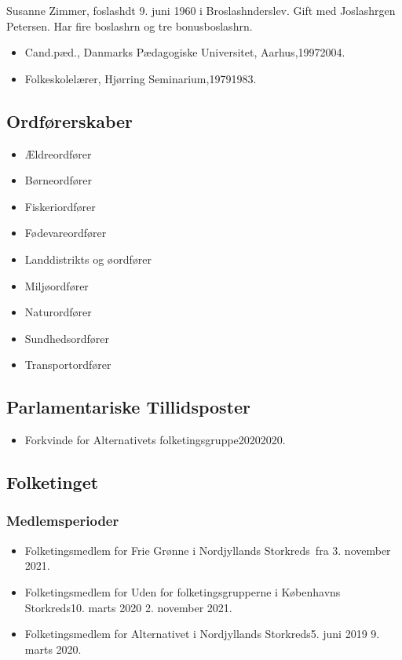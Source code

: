 \documentclass[11pt, a4paper]{awesome-cv}
\begin{document}
\makecvheader[R]
\makelettertitle
\begin{cvletter}
Susanne Zimmer, foslashdt 9. juni 1960 i Broslashnderslev. Gift med Joslashrgen Petersen. Har fire boslashrn og tre bonusboslashrn.

\begin{itemize}
\item Cand.pæd., Danmarks Pædagogiske Universitet, Aarhus,19972004.
\item Folkeskolelærer, Hjørring Seminarium,19791983.
\end{itemize}
\subsection*{Ordførerskaber}
\begin{itemize}
\item Ældreordfører
\item Børneordfører
\item Fiskeriordfører
\item Fødevareordfører
\item Landdistrikts og øordfører
\item Miljøordfører
\item Naturordfører
\item Sundhedsordfører
\item Transportordfører
\end{itemize}
\subsection*{Parlamentariske Tillidsposter}
\begin{itemize}
\item Forkvinde for Alternativets folketingsgruppe20202020.
\end{itemize}
\subsection*{Folketinget}
\subsubsection*{Medlemsperioder}
\begin{itemize}
\item Folketingsmedlem for Frie Grønne i Nordjyllands Storkreds fra 3. november 2021.
\item Folketingsmedlem for Uden for folketingsgrupperne i Københavns Storkreds10. marts 2020  2. november 2021.
\item Folketingsmedlem for Alternativet i Nordjyllands Storkreds5. juni 2019  9. marts 2020.
\end{itemize}

\end{cvletter}
\end{document}
